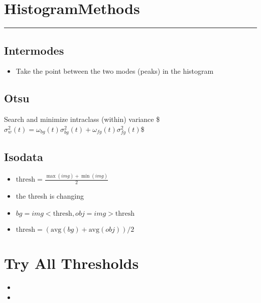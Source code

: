 \documentclass[letterpaper,10pt,english]{sphinxmanual}
\begin{document}
\section{Histogram\sphinxhyphen{}Methods}
\label{\detokenize{05-AdvancedSegmentation:histogram-methods}}

\bigskip\hrule\bigskip



\subsection{Intermodes}
\label{\detokenize{05-AdvancedSegmentation:intermodes}}\begin{itemize}
\item {} 
\sphinxAtStartPar
Take the point between the two modes (peaks) in the histogram

\end{itemize}


\subsection{Otsu}
\label{\detokenize{05-AdvancedSegmentation:otsu}}
\sphinxAtStartPar
Search and minimize intra\sphinxhyphen{}class (within) variance
\$\(\sigma^2_w(t)=\omega_{bg}(t)\sigma^2_{bg}(t)+\omega_{fg}(t)\sigma^2_{fg}(t)\)\$


\subsection{Isodata}
\label{\detokenize{05-AdvancedSegmentation:isodata}}\begin{itemize}
\item {} 
\sphinxAtStartPar
\(\textrm{thresh}= \frac{\max(img)+\min(img)}{2}\)

\item {} 
\sphinxAtStartPar
{} the thresh is changing

\item {} 
\sphinxAtStartPar
\(bg = img<\textrm{thresh}, obj = img>\textrm{thresh}\)

\item {} 
\sphinxAtStartPar
\(\textrm{thresh} = (\textrm{avg}(bg) + \textrm{avg}(obj))/2\)

\end{itemize}


\section{Try All Thresholds}
\label{\detokenize{05-AdvancedSegmentation:try-all-thresholds}}\begin{itemize}
\item {} 
\sphinxAtStartPar
{}

\item {} 
\sphinxAtStartPar
{}

\end{itemize}
\end{document}
